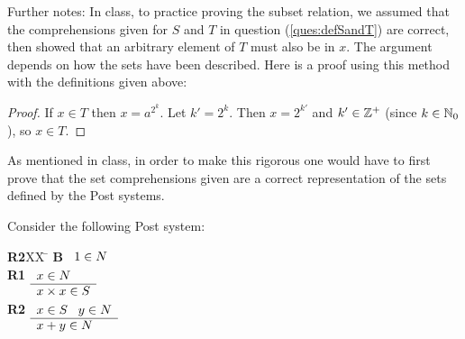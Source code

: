 \documentclass[]{exam}
\begin{document}
\begin{questions}
\begin{parts}
\begin{solution}
Further notes: In class, to practice proving the subset relation, we assumed that the
comprehensions given for $S$ and $T$ in question (\ref{ques:defSandT}) are 
correct, then showed that an arbitrary element of $T$ must also be in $x$.
The argument depends on how the sets have been described. Here is a proof
using this method with the definitions given above:
\begin{proof}
If $x \in T$ then $x = a^{2^k}$. Let $k' = 2^k$. Then $x = 2^{k'}$ and 
$k' \in \mathbb{Z}^+$ (since $k \in \mathbb{N}_0$), so $x \in T$.
\end{proof}
As mentioned in class, in order to make this rigorous one would
have to first prove that the set comprehensions given are a correct representation
of the sets defined by the Post systems.
  
\end{solution}
\end{parts}

\question Consider the following Post system:

\begin{tabbing}
{\bf R2}XX \=  \kill
{\bf B} \>
        \(\begin{array}[t]{l}
        1 \in N
        \end{array}\) \\[2ex]
{\bf R1} \>
        \(\begin{array}[t]{l}
        x \in N \\
        \hline
        x\times x \in S
        \end{array}\)\\[2ex]
{\bf R2} \>
        \(\begin{array}[t]{l}
        x \in S \;\;\; y \in N \\
        \hline
        x+y \in N
        \end{array}\)
\end{tabbing}



\end{questions}
\end{document}
